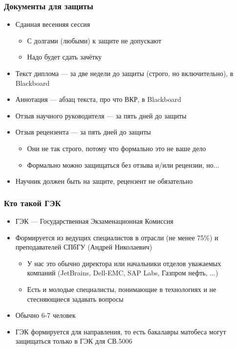 \documentclass[xetex,mathserif,serif]{beamer}
\begin{document}
    \begin{frame}
        \frametitle{Документы для защиты}
        \begin{itemize}
            \item Сданная весенняя сессия
            \begin{itemize}
                \item С долгами (любыми) к защите не допускают
                \item Надо будет сдать зачётку
            \end{itemize}
            \item Текст диплома --- за две недели до защиты (строго, но включительно), в Blackboard
            \item Аннотация --- абзац текста, про что ВКР, в Blackboard
            \item Отзыв научного руководителя --- за пять дней до защиты
            \item Отзыв рецензента --- за пять дней до защиты
            \begin{itemize}
                \item Они не так строго, потому что формально это не ваше дело
                \item Формально можно защищаться без отзыва и/или рецензии, но...
            \end{itemize}
            \item Научник должен быть на защите, рецензент не обязательно
        \end{itemize}
    \end{frame}

    \begin{frame}
        \frametitle{Кто такой ГЭК}
        \begin{itemize}
            \item ГЭК --- Государственная Экзаменационная Комиссия
            \item Формируется из ведущих специалистов в отрасли (не менее 75\%) и преподавателей СПбГУ (Андрей Николаевич)
            \begin{itemize}
                \item У нас это обычно директора или начальники отделов уважаемых компаний (JetBrains, Dell-EMC, SAP Labs, Газпром нефть, ...)
                \item Есть и молодые специалисты, понимающие в технологиях и не стесняющиеся задавать вопросы
            \end{itemize}
            \item Обычно 6-7 человек
            \item ГЭК формируется для направления, то есть бакалавры матобеса могут защищаться только в ГЭК для СВ.5006
        \end{itemize}
    \end{frame}
\end{document}
